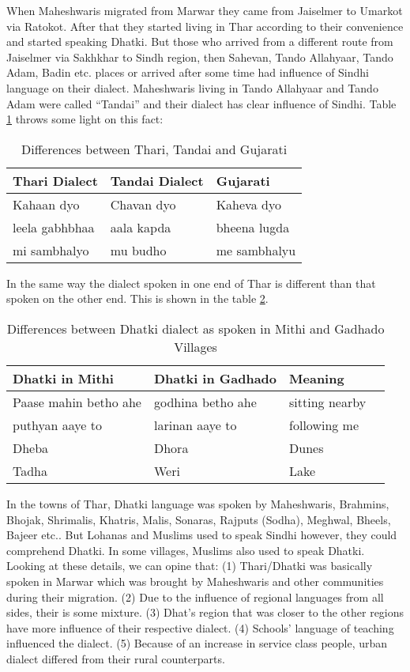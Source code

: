 When Maheshwaris migrated from Marwar they came from Jaiselmer to Umarkot via
Ratokot. After that they started living in Thar according to their convenience
and started speaking Dhatki. But those who arrived from a different route from
Jaiselmer via Sakhkhar to Sindh region, then Sahevan, Tando Allahyaar, Tando
Adam, Badin etc. places or arrived after some time had influence of Sindhi language
on their dialect. Maheshwaris living in Tando Allahyaar and Tando Adam were
called ``Tandai'' and their dialect has clear influence of Sindhi. Table
\ref{tbl:difftharitandaiguj} throws some light on this fact:
\begin{table}
\begin{center}
\begin{tabular}{lll}
\hline
\textbf{Thari Dialect} & \textbf{Tandai Dialect} & \textbf{Gujarati} \\
\hline
Kahaan dyo & Chavan dyo & Kaheva dyo \\ 
leela gabhbhaa & aala kapda & bheena lugda \\ 
mi sambhalyo & mu budho & me sambhalyu\\
\hline
\end{tabular}
\end{center}
\caption{Differences between Thari, Tandai and Gujarati}
\label{tbl:difftharitandaiguj}
\end{table}
In the same way the dialect spoken in one end of Thar is different than that spoken on
the other end. This is shown in the table \ref{tbl:diffmithigad}.
\begin{table}
\begin{center}
\begin{tabular}{llll}
\hline
\textbf{Dhatki in Mithi} & \textbf{Dhatki in Gadhado} & \textbf{Meaning} \\
\hline
Paase mahin betho ahe & godhina betho ahe & sitting nearby \\
puthyan aaye to & larinan aaye to & following me \\
Dheba & Dhora & Dunes \\
Tadha & Weri &  Lake \\
\hline
\end{tabular}
\end{center}
\caption{Differences between Dhatki dialect as spoken in Mithi and Gadhado Villages}
\label{tbl:diffmithigad}
\end{table}
In the towns of Thar, Dhatki language was spoken by Maheshwaris, Brahmins,
Bhojak, Shrimalis, Khatris, Malis, Sonaras, Rajputs (Sodha), Meghwal, Bheels,
Bajeer etc.. But Lohanas and Muslims used to speak Sindhi however, they could
comprehend Dhatki. In some villages, Muslims also used to speak Dhatki. Looking
at these details, we can opine that: (1) Thari/Dhatki was basically spoken in
Marwar which was brought by Maheshwaris and other communities during their
migration. (2) Due to the influence of regional languages from all sides, their
is some mixture. (3) Dhat's region that was closer to the other regions have
more influence of their respective dialect. (4) Schools' language of teaching
influenced the dialect. (5) Because of an increase in service class people,
urban dialect differed from their rural counterparts.

